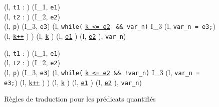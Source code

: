 \begin{figure*}[h!]
  \scriptsize{
    {
      {
        (l, \mbox{\lstinline't1'} : ) 
        (I_1, \mbox{\lstinline'e1'}) \\
        (l, \mbox{\lstinline't2'} : ) 
        (I_2, \mbox{\lstinline'e2'}) \\
        (l, \mbox{\lstinline'p'})  (I_3, \mbox{\lstinline'e3'})
      }
      {
         {
           {
            \cdot
            (l, \mbox{\lstinline'while('}
            \underline{\mbox{\lstinline'k <= e2'}}~ \mbox{\lstinline'&& var_n)'}
            \bopen
            I_3
            \cdot (l, \mbox{\lstinline'var_n = e3;'})
            \cdot (l, \underline{\mbox{\lstinline'k++'}} \semicolon)
            \bclose )
            \cdot
            (l, \underline{\mbox{\lstinline'k'}} \Zclear \semicolon )
            \cdot
            (l, \underline{\mbox{\lstinline'e1'}} \Zclear \semicolon )
            \cdot
            (l, \underline{\mbox{\lstinline'e2'}} \Zclear \semicolon ),
            \mbox{\lstinline'var_n'})
          }
        }
      }{}
    }

    {
      {
        (l, \mbox{\lstinline't1'} : ) 
        (I_1, \mbox{\lstinline'e1'}) \\
        (l, \mbox{\lstinline't2'} : ) 
        (I_2, \mbox{\lstinline'e2'}) \\
        (l, \mbox{\lstinline'p'})  (I_3, \mbox{\lstinline'e3'})
      }
      {
         {
           {
            \cdot
            (l, \mbox{\lstinline'while('}
            \underline{\mbox{\lstinline'k <= e2'}}~\mbox{\lstinline'&& !var_n)'}
            \bopen
            I_3
            \cdot (l, \mbox{\lstinline'var_n = e3;'})
            \cdot (l, \underline{\mbox{\lstinline'k++'}} \semicolon)
            \bclose )
            \cdot
            (l, \underline{\mbox{\lstinline'k'}} \Zclear \semicolon )
            \cdot
            (l, \underline{\mbox{\lstinline'e1'}} \Zclear \semicolon )
            \cdot
            (l, \underline{\mbox{\lstinline'e2'}} \Zclear \semicolon ),
            \mbox{\lstinline'var_n'})
          }
        }
      }{}
    }
  }
  \caption{Règles de traduction pour les prédicats quantifiés}
  \label{fig:quantif}
\end{figure*}
